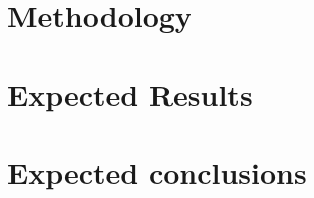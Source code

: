 
\section{Methodology}
\label{sec:methodology}



\section{Expected Results}
\label{sec:expected-results}



\section{Expected conclusions}
\label{sec:expected-conclusions}


